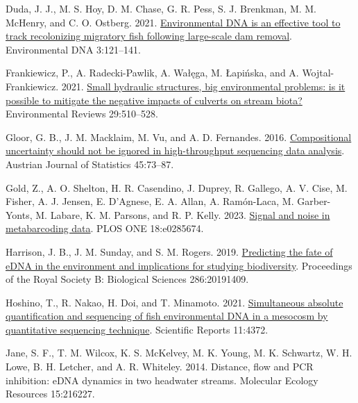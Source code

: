 \documentclass[
]{article}
\newlength{\cslhangindent}
\newlength{\cslentryspacingunit} %
\newenvironment{CSLReferences}[2] %
 {%
  \setlength{\parindent}{0pt}
  \ifodd #1
  \let\oldpar\par
  \def\par{\hangindent=\cslhangindent\oldpar}
  \fi
  \setlength{\parskip}{#2\cslentryspacingunit}
 }%
 {}
\begin{document}
\begin{CSLReferences}{1}{0}
\leavevmode{}%
Duda, J. J., M. S. Hoy, D. M. Chase, G. R. Pess, S. J. Brenkman, M. M.
McHenry, and C. O. Ostberg. 2021.
\href{https://doi.org/10.1002/edn3.134}{Environmental DNA is an
effective tool to track recolonizing migratory fish following
large-scale dam removal}. Environmental DNA 3:121--141.

\leavevmode{}%
Frankiewicz, P., A. Radecki-Pawlik, A. Wałęga, M. Łapińska, and A.
Wojtal-Frankiewicz. 2021.
\href{https://doi.org/10.1139/er-2020-0126}{Small hydraulic structures,
big environmental problems: is it possible to mitigate the negative
impacts of culverts on stream biota?} Environmental Reviews 29:510--528.

\leavevmode{}%
Gloor, G. B., J. M. Macklaim, M. Vu, and A. D. Fernandes. 2016.
\href{https://doi.org/10.17713/ajs.v45i4.122}{Compositional uncertainty
should not be ignored in high-throughput sequencing data analysis}.
Austrian Journal of Statistics 45:73--87.

\leavevmode{}%
Gold, Z., A. O. Shelton, H. R. Casendino, J. Duprey, R. Gallego, A. V.
Cise, M. Fisher, A. J. Jensen, E. D'Agnese, E. A. Allan, A. Ramón-Laca,
M. Garber-Yonts, M. Labare, K. M. Parsons, and R. P. Kelly. 2023.
\href{https://doi.org/10.1371/journal.pone.0285674}{Signal and noise in
metabarcoding data}. PLOS ONE 18:e0285674.

\leavevmode{}%
Harrison, J. B., J. M. Sunday, and S. M. Rogers. 2019.
\href{https://doi.org/10.1098/rspb.2019.1409}{Predicting the fate of
eDNA in the environment and implications for studying biodiversity}.
Proceedings of the Royal Society B: Biological Sciences 286:20191409.

\leavevmode{}%
Hoshino, T., R. Nakao, H. Doi, and T. Minamoto. 2021.
\href{https://doi.org/10.1038/s41598-021-83318-6}{Simultaneous absolute
quantification and sequencing of fish environmental DNA in a mesocosm by
quantitative sequencing technique}. Scientific Reports 11:4372.

\leavevmode{}%
Jane, S. F., T. M. Wilcox, K. S. McKelvey, M. K. Young, M. K. Schwartz,
W. H. Lowe, B. H. Letcher, and A. R. Whiteley. 2014. Distance, flow and
PCR inhibition: eDNA dynamics in two headwater streams. Molecular
Ecology Resources 15:216227.


\end{CSLReferences}
\end{document}
